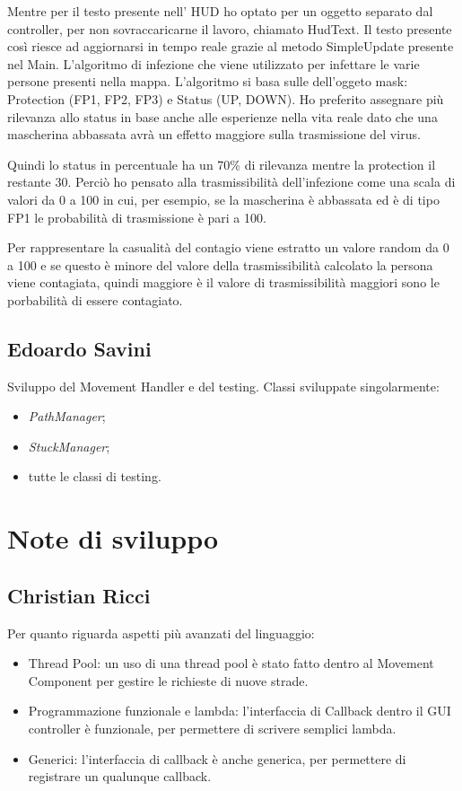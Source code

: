Mentre per il testo presente nell' HUD ho optato per un oggetto separato dal controller, per non sovraccaricarne il lavoro, chiamato HudText.
Il testo presente così riesce ad aggiornarsi in tempo reale grazie al metodo SimpleUpdate presente nel Main.
L'algoritmo di infezione che viene utilizzato per infettare le varie persone presenti nella mappa.
L'algoritmo si basa sulle dell'oggeto mask: Protection (FP1, FP2, FP3) e Status (UP, DOWN).
Ho preferito assegnare più rilevanza allo status in base anche alle esperienze nella vita reale dato che una mascherina abbassata avrà un effetto maggiore sulla trasmissione del virus.

Quindi lo status in percentuale ha un 70\% di rilevanza mentre la protection il restante 30.
Perciò ho pensato alla trasmissibilità dell'infezione come una scala di valori da 0 a 100 in cui, per esempio, se la mascherina è abbassata ed è di tipo FP1 le probabilità di trasmissione è pari a 100.

Per rappresentare la casualità del contagio viene estratto un valore random da 0 a 100 e se questo è minore del valore della trasmissibilità calcolato la persona viene contagiata, quindi maggiore è il valore di trasmissibilità maggiori sono le porbabilità di essere contagiato.

\subsection{Edoardo Savini}

Sviluppo del Movement Handler e del testing.
Classi sviluppate singolarmente:
\begin{itemize}
    \item \emph{PathManager};
    \item \emph{StuckManager};
    \item tutte le classi di testing.
\end{itemize}

\section{Note di sviluppo}

\subsection{Christian Ricci}

Per quanto riguarda aspetti più avanzati del linguaggio:
\begin{itemize}
\item Thread Pool: un uso di una thread pool è stato fatto dentro al Movement Component per gestire le richieste di nuove strade.
\item Programmazione funzionale e lambda: l'interfaccia di Callback dentro il GUI controller è funzionale, per permettere di scrivere semplici lambda.
\item Generici: l'interfaccia di callback è anche generica, per permettere di registrare un qualunque callback.
\end{itemize}

